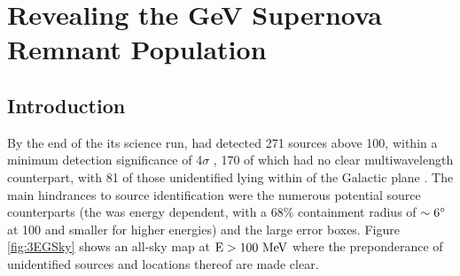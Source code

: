 \chapter{Revealing the GeV Supernova Remnant Population}
\label{chap:snrCat}


\section{Introduction}\label{snrCat:Intro}
By the end of the its science run, \egret{} had detected 271 sources above 100\mev{}, within a minimum detection significance of 4$\sigma$ , 170 of which had no clear multiwavelength counterpart, with 81 of those unidentified lying within \blat of the Galactic plane \citep{Hartman99}. The main hindrances to source identification were the numerous potential source counterparts (the \egret{} \psf{} was energy dependent, with a 68\% containment radius of ${\rm \sim 6 ^\circ}$ at 100\mev{} and smaller for higher energies) and the large \egret{} error boxes. Figure \ref{fig:3EGSky} shows an \egret{} all-sky map at ${\rm E > 100 ~\mathrm{MeV}}$ where the preponderance of unidentified sources and locations thereof are made clear.  


